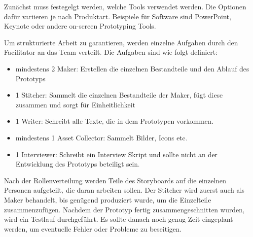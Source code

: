 Zunächst muss festegelgt werden, welche Tools verwendet werden. Die Optionen dafür variieren je nach Produktart. Beispiele für Software sind PowerPoint, Keynote oder andere on-screen Prototyping Tools.

Um strukturierte Arbeit zu garantieren, werden einzelne Aufgaben durch den Facilitator an das Team verteilt. Die Aufgaben sind wie folgt definiert:
\begin{itemize}
	\item mindestens 2 Maker:
	Erstellen die einzelnen Bestandteile und den Ablauf des Prototyps
	\item 1 Stitcher:
	Sammelt die einzelnen Bestandteile der Maker, fügt diese zusammen und sorgt für Einheitlichkeit
	\item 1 Writer:
	Schreibt alle Texte, die in dem Prototypen vorkommen.
	\item mindestens 1 Asset Collector:
	Sammelt Bilder, Icons etc.
	\item 1 Interviewer:
	Schreibt ein Interview Skript und sollte nicht an der Entwicklung des Prototyps beteiligt sein.
\end{itemize}

Nach der Rollenverteilung werden Teile des Storyboards auf die einzelnen Personen aufgeteilt, die daran arbeiten sollen. Der Stitcher wird zuerst auch als Maker behandelt, bis genügend produziert wurde, um die Einzelteile zusammenzufügen. Nachdem der Prototyp fertig zusammengeschnitten wurden, wird ein Testlauf durchgeführt. Es sollte danach noch genug Zeit eingeplant werden, um eventuelle Fehler oder Probleme zu beseitigen.

